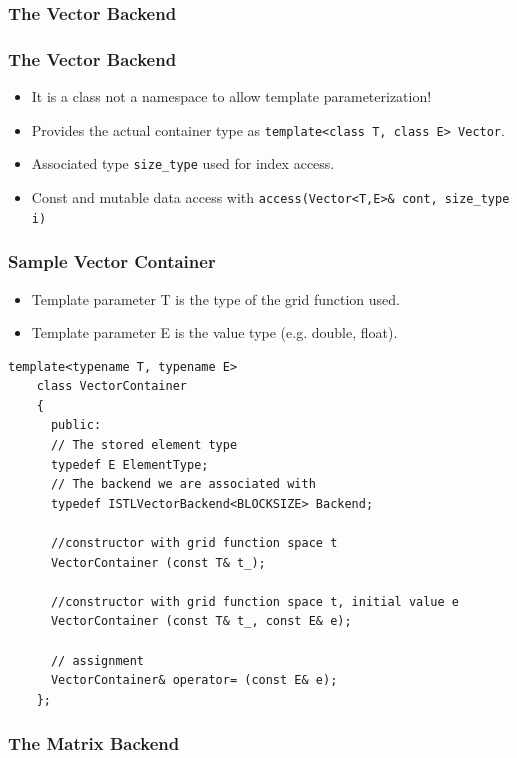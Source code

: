 \subsubsection{The Vector Backend}
\label{sec:vector-backend}

\begin{frame}
  \frametitle<presentation>{The Vector Backend}
  \begin{itemize}
  \item It is a class not a namespace to allow template parameterization!
  \item Provides the actual container type as
    \lstinline!template<class T, class E> Vector!.
  \item Associated type \lstinline!size_type! used for index access.
  \item Const and mutable data access with
    \lstinline!access(Vector<T,E>& cont, size_type i)!
  \end{itemize}
\end{frame}

\begin{frame}[fragile]
  \frametitle{Sample Vector Container}
  \begin{itemize}
  \item Template parameter T is the type of the grid function used.
  \item Template parameter E is the value type (e.g. double, float).
  \end{itemize}
  \begin{lstlisting}[basicstyle=\scriptsize]
    template<typename T, typename E>
    class VectorContainer
    {
      public:
      // The stored element type
      typedef E ElementType;
      // The backend we are associated with
      typedef ISTLVectorBackend<BLOCKSIZE> Backend;

      //constructor with grid function space t
      VectorContainer (const T& t_);

      //constructor with grid function space t, initial value e
      VectorContainer (const T& t_, const E& e);

      // assignment
      VectorContainer& operator= (const E& e);
    };
  \end{lstlisting}
\end{frame}
\subsubsection{The Matrix Backend}
\label{sec:matrix-backend}

